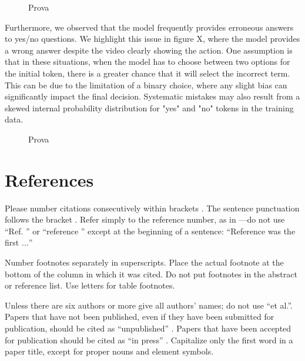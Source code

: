 \documentclass[conference]{IEEEtran}
\begin{document}
\begin{figure}[ht]
  \centering
  \caption{Prova}
  \label{fig:animation}
\end{figure}

Furthermore, we observed that the model frequently provides erroneous answers to yes/no questions. We highlight this issue in figure X, where the model provides a wrong answer despite the video clearly showing the action. One assumption is that in these situations, when the model has to choose between two options for the initial token, there is a greater chance that it will select the incorrect term. This can be due to the limitation of a binary choice, where any slight bias can significantly impact the final decision. Systematic mistakes may also result from a skewed internal probability distribution for "yes" and "no" tokens in the training data.

\begin{figure}[ht]
  \centering
  \caption{Prova}
  \label{fig:animation}
\end{figure}



\section*{References}

Please number citations consecutively within brackets \cite{b1}. The 
sentence punctuation follows the bracket \cite{b2}. Refer simply to the reference 
number, as in \cite{b3}---do not use ``Ref. \cite{b3}'' or ``reference \cite{b3}'' except at 
the beginning of a sentence: ``Reference \cite{b3} was the first $\ldots$''

Number footnotes separately in superscripts. Place the actual footnote at 
the bottom of the column in which it was cited. Do not put footnotes in the 
abstract or reference list. Use letters for table footnotes.

Unless there are six authors or more give all authors' names; do not use 
``et al.''. Papers that have not been published, even if they have been 
submitted for publication, should be cited as ``unpublished'' \cite{b4}. Papers 
that have been accepted for publication should be cited as ``in press'' \cite{b5}. 
Capitalize only the first word in a paper title, except for proper nouns and 
element symbols.
\end{document}
